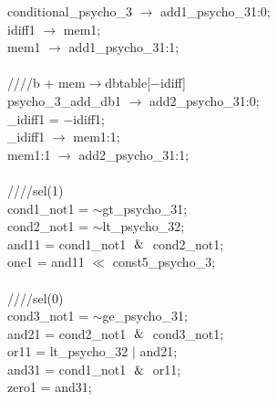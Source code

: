   \hspace*{2em}conditional\_psycho\_3 $\rightarrow$ add1\_psycho\_31:0; \\
   \hspace*{2em}idiff1 $\rightarrow$ mem1; \\
   \hspace*{2em}mem1 $\rightarrow$ add1\_psycho\_31:1; \\
   \\
   \hspace*{2em}////b + mem$\rightarrow$dbtable[$-$idiff] \\
   \hspace*{2em}psycho\_3\_add\_db1 $\rightarrow$ add2\_psycho\_31:0; \\
   \hspace*{2em}\_idiff1 = $-$idiff1; \\
   \hspace*{2em}\_idiff1 $\rightarrow$ mem1:1; \\
   \hspace*{2em}mem1:1 $\rightarrow$ add2\_psycho\_31:1; \\
   \\
   \hspace*{2em}////sel(1) \\
   \hspace*{2em}cond1\_not1 = $\sim$gt\_psycho\_31; \\
   \hspace*{2em}cond2\_not1 = $\sim$lt\_psycho\_32; \\
   \hspace*{2em}and11 = cond1\_not1 $\And$ cond2\_not1; \\
   \hspace*{2em}one1 = and11 $\ll$ const5\_psycho\_3; \\
   \\
   \hspace*{2em}////sel(0) \\
   \hspace*{2em}cond3\_not1 = $\sim$ge\_psycho\_31; \\
   \hspace*{2em}and21 = cond2\_not1 $\And$ cond3\_not1; \\
   \hspace*{2em}or11 = lt\_psycho\_32 $\vert$ and21; \\
   \hspace*{2em}and31 = cond1\_not1 $\And$ or11; \\
   \hspace*{2em}zero1 = and31; \\
